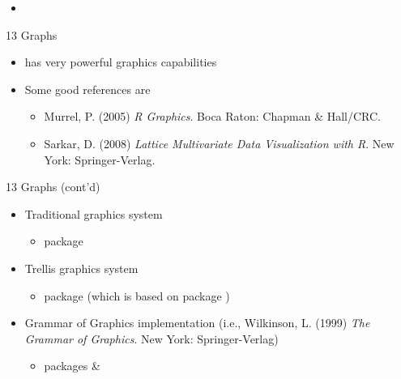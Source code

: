 \documentclass[14pt, aspectratio=169, sectionpage=simple, xclolor=table]{beamer}
\begin{document}
\begin{frame}[lbslide]{}
\begin{itemize}
	\item {}
\end{itemize}
\end{frame}



\begin{frame}[fragile]{13 Graphs}
\begin{itemize}
\item \R has very powerful graphics capabilities
\nl
\item Some good references are
\begin{itemize}
  \item Murrel, P. (2005) \emph{R Graphics}. Boca Raton: Chapman \& Hall/CRC.
  \item Sarkar, D. (2008) \emph{Lattice Multivariate Data Visualization with R}. New York: Springer-Verlag.
  \nl
\end{itemize}
\end{itemize}
\end{frame}
\begin{frame}{13 Graphs (cont'd)}
\begin{itemize}
\item Traditional graphics system
\begin{itemize}
\item package 
\nl
\end{itemize}
\item Trellis graphics system
\begin{itemize}
\item package  (which is based on package )
\nl
\end{itemize}
\item Grammar of Graphics implementation (i.e., Wilkinson, L. (1999) \emph{The Grammar of Graphics}. New York: Springer-Verlag)
\begin{itemize}
\item packages  \& 
\end{itemize}
\end{itemize}
\end{frame}
\end{document}
